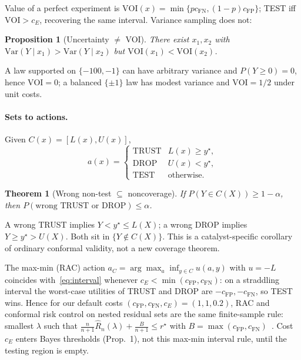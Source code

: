 \documentclass[10pt,twocolumn]{article}
\newtheorem{proposition}{Proposition}
\newtheorem{theorem}{Theorem}
\newcommand{\cFP}{c_{\mathrm{FP}}}
\newcommand{\cFN}{c_{\mathrm{FN}}}
\newcommand{\cE}{c_{E}}
\begin{document}
Value of a perfect experiment is \(\mathrm{VOI}(x)=\min\{p\cFN,(1-p)\cFP\}\); TEST iff \(\mathrm{VOI}>\cE\), recovering the same interval. Variance sampling does not:
\begin{proposition}[Uncertainty \(\neq\) VOI]
There exist \(x_1,x_2\) with \(\mathrm{Var}(Y\mid x_1)>\mathrm{Var}(Y\mid x_2)\) but \(\mathrm{VOI}(x_1)<\mathrm{VOI}(x_2)\).
\end{proposition}
\vspace{-0.35em}
A law supported on \(\{-100,-1\}\) can have arbitrary variance and \(P(Y\ge 0)=0\), hence \(\mathrm{VOI}=0\); a balanced \(\{\pm 1\}\) law has modest variance and \(\mathrm{VOI}=1/2\) under unit costs.

\paragraph{Sets to actions.}
Given \(C(x)=[L(x),U(x)]\),
\begin{equation}
a(x)=\begin{cases}
\mathrm{TRUST} & L(x)\ge y^\star,\\
\mathrm{DROP} & U(x)< y^\star,\\
\mathrm{TEST} & \text{otherwise.}
\end{cases}
\label{eq:interval}
\end{equation}
\begin{theorem}[Wrong non-test \(\subseteq\) noncoverage]
If \(P(Y\in C(X))\ge 1-\alpha\), then \(P(\text{wrong TRUST or DROP})\le \alpha\).
\end{theorem}
\vspace{-0.35em}
A wrong TRUST implies \(Y<y^\star\le L(X)\); a wrong DROP implies \(Y\ge y^\star>U(X)\). Both sit in \(\{Y\notin C(X)\}\). This is a catalyst-specific corollary of ordinary conformal validity, not a new coverage theorem.

The max-min (RAC) action \(a_C=\arg\max_a\inf_{y\in C} u(a,y)\) with \(u=-L\) coincides with~\eqref{eq:interval} whenever \(\cE<\min(\cFP,\cFN)\): on a straddling interval the worst-case utilities of TRUST and DROP are \(-\cFP,-\cFN\), so TEST wins. Hence for our default costs \((\cFP,\cFN,\cE)=(1,1,0.2)\), RAC and conformal risk control on nested residual sets are the same finite-sample rule: smallest \(\lambda\) such that
\(\frac{n}{n+1}\widehat R_n(\lambda)+\frac{B}{n+1}\le r^\star\)
with \(B=\max(\cFP,\cFN)\)~\citep{angelopoulos2024crc,kiyani2025}. Cost \(c_E\) enters Bayes thresholds (Prop.~1), not this max-min interval rule, until the testing region is empty.
\end{document}
